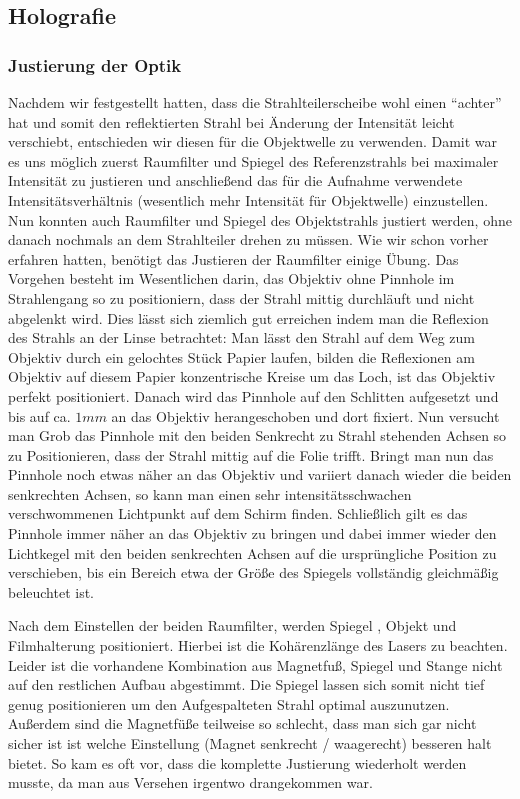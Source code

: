 \documentclass[12pt]{article}
\begin{document}
\subsection{Holografie}
\subsubsection{Justierung der Optik}
Nachdem wir festgestellt hatten, dass die Strahlteilerscheibe wohl einen ``achter'' hat und somit den reflektierten Strahl bei Änderung der Intensität leicht
verschiebt, entschieden wir diesen für die Objektwelle zu verwenden. Damit war es uns möglich zuerst Raumfilter und Spiegel des Referenzstrahls bei maximaler
Intensität zu justieren und anschließend das für die Aufnahme verwendete Intensitätsverhältnis (wesentlich mehr Intensität für Objektwelle) einzustellen. Nun 
konnten auch Raumfilter und Spiegel des Objektstrahls justiert werden, ohne danach nochmals an dem Strahlteiler drehen zu müssen.
Wie wir schon vorher erfahren hatten, benötigt das Justieren der Raumfilter einige Übung. Das Vorgehen besteht im Wesentlichen darin, das Objektiv
ohne Pinnhole im Strahlengang so zu positioniern, dass der Strahl mittig durchläuft und nicht abgelenkt wird. Dies lässt sich ziemlich gut erreichen
indem
man die Reflexion des Strahls an der Linse betrachtet: Man lässt den Strahl auf dem Weg zum Objektiv durch ein gelochtes Stück Papier laufen, bilden die 
Reflexionen am Objektiv auf diesem Papier konzentrische Kreise um das Loch, ist das Objektiv perfekt positioniert.
Danach wird das Pinnhole auf den Schlitten aufgesetzt
und bis auf ca. $1mm$ an das Objektiv herangeschoben und dort fixiert. Nun versucht man Grob das Pinnhole mit den beiden Senkrecht zu Strahl stehenden Achsen
so zu Positionieren, dass der Strahl mittig auf die Folie trifft. Bringt man nun das Pinnhole noch etwas näher an das Objektiv und variiert danach wieder die
beiden senkrechten Achsen, so kann man einen sehr intensitätsschwachen verschwommenen Lichtpunkt auf dem Schirm finden. Schließlich gilt es das Pinnhole immer
näher an das Objektiv zu bringen und dabei immer wieder den Lichtkegel mit den beiden senkrechten Achsen auf die ursprüngliche Position zu verschieben, bis 
ein Bereich etwa der Größe des Spiegels vollständig gleichmäßig beleuchtet ist.

Nach dem Einstellen der beiden Raumfilter, werden Spiegel , Objekt und Filmhalterung positioniert. Hierbei ist die Kohärenzlänge des Lasers zu beachten.
Leider ist die vorhandene Kombination aus Magnetfuß, Spiegel und Stange nicht auf den restlichen Aufbau abgestimmt. Die Spiegel lassen sich somit nicht tief
genug positionieren um den Aufgespalteten Strahl optimal auszunutzen. Außerdem sind die Magnetfüße teilweise so schlecht, dass man sich gar nicht sicher ist
ist welche Einstellung (Magnet senkrecht / waagerecht) besseren halt bietet. So kam es oft vor, dass die komplette Justierung wiederholt werden musste, da man
aus Versehen irgentwo drangekommen war.
\end{document}
